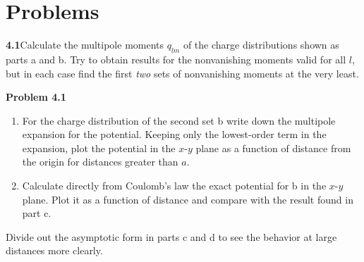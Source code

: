 
\section*{Problems}

\par\bigskip
\noindent\textbf{4.1}\quad Calculate the multipole moments $q_{lm}$ of the charge distributions shown as parts a and b. Try to obtain results for the nonvanishing moments valid for all $l$, but in each case find the first \emph{two} sets of nonvanishing moments at the very least.

\begin{center}
\hspace{3em}
\par\vspace{0.5em}\textbf{Problem 4.1}
\end{center}

\begin{enumerate}
\item[(c)] For the charge distribution of the second set b write down the multipole expansion for the potential. Keeping only the lowest-order term in the expansion, plot the potential in the $x$-$y$ plane as a function of distance from the origin for distances greater than $a$.
\item[(d)] Calculate directly from Coulomb's law the exact potential for b in the $x$-$y$ plane. Plot it as a function of distance and compare with the result found in part c.
\end{enumerate}
Divide out the asymptotic form in parts c and d to see the behavior at large distances more clearly.
\solution

